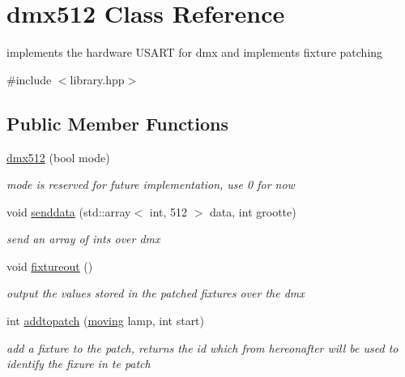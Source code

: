 \hypertarget{classdmx512}{}\section{dmx512 Class Reference}
\label{classdmx512}


implements the hardware U\+S\+A\+RT for dmx and implements fixture patching  




{\ttfamily \#include $<$library.\+hpp$>$}

\subsection*{Public Member Functions}
\begin{DoxyCompactItemize}
\item 
\mbox{\label{classdmx512_a6a1e026d2dfd58fe54f98fa8dfa27303}} 
\hyperlink{classdmx512_a6a1e026d2dfd58fe54f98fa8dfa27303}{dmx512} (bool mode)
\begin{DoxyCompactList}\small\item\em mode is reserved for future implementation, use 0 for now \end{DoxyCompactList}\item 
void \hyperlink{classdmx512_afcbc9b157dfebd6c35795738641761e9}{senddata} (std\+::array$<$ int, 512 $>$ data, int grootte)
\begin{DoxyCompactList}\small\item\em send an array of ints over dmx \end{DoxyCompactList}\item 
\mbox{\label{classdmx512_a1d9cbfe77c6db4d1e0808ba6abede7a2}} 
void \hyperlink{classdmx512_a1d9cbfe77c6db4d1e0808ba6abede7a2}{fixtureout} ()
\begin{DoxyCompactList}\small\item\em output the values stored in the patched fixtures over the dmx \end{DoxyCompactList}\item 
\mbox{\label{classdmx512_a6a6dca3c6513b17fa73426891b82fd05}} 
int \hyperlink{classdmx512_a6a6dca3c6513b17fa73426891b82fd05}{addtopatch} (\hyperlink{classmoving}{moving} lamp, int start)
\begin{DoxyCompactList}\small\item\em add a fixture to the patch, returns the id which from hereonafter will be used to identify the fixure in te patch \end{DoxyCompactList}\item 

\end{DoxyCompactItemize}
